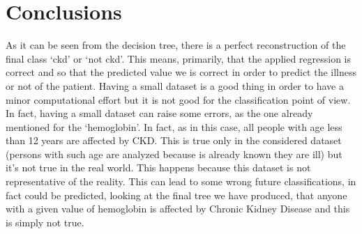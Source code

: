 \documentclass[a4paper,12pt,oneside,titlepage]{article}
\begin{document}
	\section{Conclusions}
	As it can be seen from the decision tree, there is a perfect reconstruction of the final class ‘ckd’ or ‘not ckd’. This means, primarily, that the applied regression is correct and so that the predicted value we is correct in order to predict the illness or not of the patient. 
	Having a small dataset is a good thing in order to have a minor computational effort but it is not good for the classification point of view. In fact, having a small dataset can raise some errors, as the one already mentioned for the ‘hemoglobin’. In fact, as in this case, all people with age less than 12 years are affected by CKD. This is true only in the considered dataset (persons with such age are analyzed because is already known they are ill)  but it’s not true in the real world. This happens because this dataset is not representative of the reality. This can lead to some wrong future classifications, in fact could be predicted, looking at the final tree we have produced, that anyone with a given value of hemoglobin is affected by Chronic Kidney Disease and this is simply not true.
	
	
	
	
\end{document}
